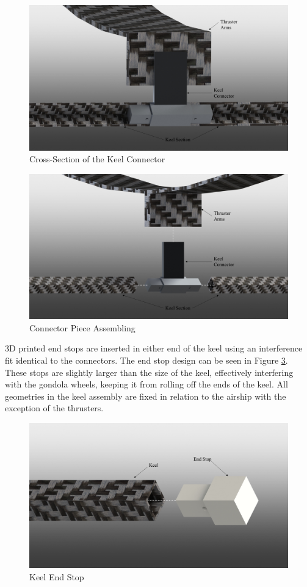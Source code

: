 \documentclass[../main.tex]{subfiles}
\begin{document}
\begin{figure}[H]
	\centering
	\includegraphics[width=.9\linewidth]{img/design/keel/thrusterArmConnectorCrossSection.png}
	\caption{Cross-Section of the Keel Connector}
	\label{fig:thrusterArmConnectorCrossSection}
\end{figure}
\begin{figure}[H]
	\centering
	\includegraphics[width=.9\linewidth]{img/design/keel/thrusterArmConnectorPiece.png}
	\caption{Connector Piece Assembling}
	\label{fig:thrusterArmConnectorPiece}
\end{figure}

 3D printed end stops are inserted in either end of the keel using an interference fit identical to the connectors. The end stop design can be seen in Figure \ref{fig:keelEndCap}. These stops are slightly larger than the size of the keel, effectively interfering with the gondola wheels, keeping it from rolling off the ends of the keel. All geometries in the keel assembly are fixed in relation to the airship with the exception of the thrusters.

\begin{figure}[H]
	\centering
	\includegraphics[width=.8\linewidth]{img/design/keel/keelEndCap.png}
	\caption{Keel End Stop}
	\label{fig:keelEndCap}
\end{figure}
\end{document}

